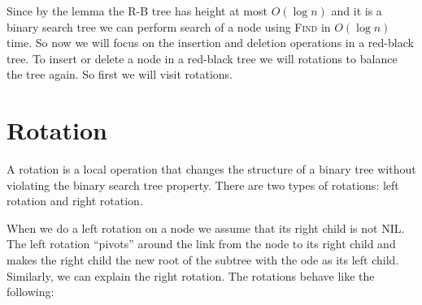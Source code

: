 Since by the lemma the R-B tree has height at most $O(\log n)$ and it is a binary search tree we can perform search of a node using \textsc{Find} in $O(\log n)$ time. So now we will focus on the insertion and deletion operations in a red-black tree.  To insert or delete a node in a red-black tree we will  rotations to balance the tree again. So first we will visit rotations.
\section{Rotation}
A rotation is a local operation that changes the structure of a binary tree without violating the binary search tree property. There are two types of rotations: left rotation and right rotation.

When we do a left rotation on a node we assume that its right child is not NIL. The left rotation ``pivots'' around the link from the node to its right child and makes the right child the new root of the subtree with the ode as its left child.  Similarly, we can explain the right rotation. The rotations behave like the following:

